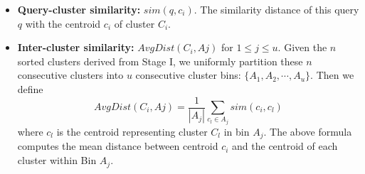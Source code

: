 \comments{
\[ sim(q,c_i),   
\{ AvgDist(sim(c_i, c_l) \mbox{ for } c_l \in A_j) \}^u_{j=1}, 
\]
\[ 
     \{  |c_i  \cap  B_j|    \}^{v}_{j=1},  
\{  AvgScore (c_i  \cap  B_j)    \}^{v}_{j=1}. 
\] 
}
\begin{itemize}[leftmargin=*]
\item \textbf{Query-cluster similarity:} $sim(q,c_i)$.
The similarity distance of this query $q$ with the centroid $c_i$ of cluster $C_i$.  
  


\item \textbf{Inter-cluster similarity:} $AvgDist(C_i, Aj)$ for $1 \leq j \le u$.
Given the $n$ sorted clusters derived from Stage I, we uniformly partition  these $n$ consecutive  clusters into $u$ consecutive cluster bins:
$\{ A_1, A_2, \cdots, A_u\}$. Then we define
\[
AvgDist(C_i, Aj) = \frac{1}{|A_j|} \sum_{ c_l \in A_j}
 sim(c_i, c_l) 
\]
where  $c_l$ is the centroid representing cluster $C_l$ in bin $A_j$.
The above formula computes the mean distance between centroid $c_i$ and the centroid of each cluster within  Bin $A_j$.




\end{itemize}
